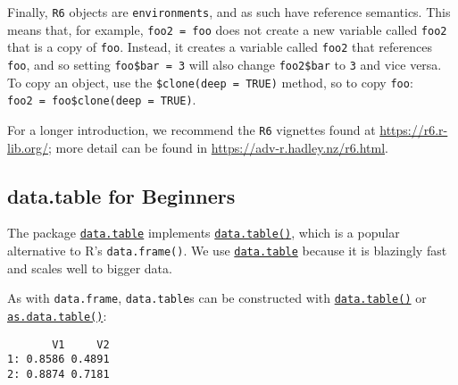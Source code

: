 Finally, \texttt{R6} objects are \texttt{environments}, and as such have
reference semantics. This means that, for example, \texttt{foo2\ =\ foo}
does not create a new variable called \texttt{foo2} that is a copy of
\texttt{foo}. Instead, it creates a variable called \texttt{foo2} that
references \texttt{foo}, and so setting \texttt{foo\$bar\ =\ 3} will
also change \texttt{foo2\$bar} to \texttt{3} and vice versa. To copy an
object, use the \texttt{\$clone(deep\ =\ TRUE)} method, so to copy
\texttt{foo}:
\texttt{foo2\ =\ foo\$clone(deep\ =\ TRUE)}{}.

For a longer introduction, we recommend the \texttt{R6} vignettes found
at \url{https://r6.r-lib.org/}; more detail can be found in
\url{https://adv-r.hadley.nz/r6.html}.

\hypertarget{sec-data.table}{%
\subsection{data.table for Beginners}\label{sec-data.table}}

The package
\href{https://cran.r-project.org/package=data.table}{\texttt{data.table}}
implements
\href{https://www.rdocumentation.org/packages/data.table/topics/data.table-package}{\texttt{data.table()}},
which is a popular alternative to R's \texttt{data.frame()}. We use
\href{https://cran.r-project.org/package=data.table}{\texttt{data.table}}
because it is blazingly fast and scales well to bigger data.

As with \texttt{data.frame}, \texttt{data.table}s can be constructed
with
\href{https://www.rdocumentation.org/packages/data.table/topics/data.table-package}{\texttt{data.table()}}
or
\href{https://www.rdocumentation.org/packages/data.table/topics/as.data.table}{\texttt{as.data.table()}}:

\begin{Shaded}
\begin{Highlighting}[]
\NormalTok{(}\NormalTok{(}\NormalTok{(}\NormalTok{), }\NormalTok{, }\NormalTok{))}
\end{Highlighting}
\end{Shaded}

\begin{verbatim}
       V1     V2
1: 0.8586 0.4891
2: 0.8874 0.7181
\end{verbatim}

